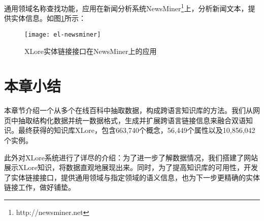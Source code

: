通用领域名称查找功能，应用在新闻分析系统NewsMiner\footnote{http://newsminer.net}上，分析新闻文本，提供实体信息。如图\ref{fig:el-newsminer}所示：
\begin{figure}[H]
  \centering
  \texttt{[image: el-newsminer]}
  \caption{XLore实体链接接口在NewsMiner上的应用}
  \label{fig:el-newsminer}
\end{figure}

\section{本章小结}
本章节介绍一个从多个在线百科中抽取数据，构成跨语言知识库的方法。我们从网页中抽取结构化数据并统一数据格式，生成并扩展跨语言链接信息来融合双语知识。最终获得的知识库XLore，包含663,740个概念，56,449个属性以及10,856,042个实例。

此外对XLore系统进行了详尽的介绍：为了进一步了解数据情况，我们搭建了网站展示XLore知识，将数据直观地展现出来。同时，为了提高知识库的可用性，开发了实体链接接口，提供通用领域与指定领域的语义信息，也为下一步更精确的实体链接工作，做好铺垫。


